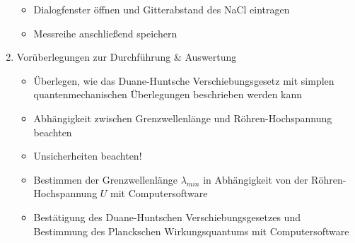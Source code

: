 \documentclass{article}
\begin{document}
\begin{enumerate}[label = (\Roman*)]
\begin{itemize}
            \item Dialogfenster öffnen und Gitterabstand des NaCl eintragen
            \item Messreihe anschließend speichern
        \end{itemize}

    \item Vorüberlegungen zur Durchführung \& Auswertung
        \begin{itemize}
            \item Überlegen, wie das Duane-Huntsche Verschiebungsgesetz mit simplen quantenmechanischen Überlegungen beschrieben werden kann
            \item Abhängigkeit zwischen Grenzwellenlänge und Röhren-Hochspannung beachten
            \item Unsicherheiten beachten!
            \item Bestimmen der Grenzwellenlänge $\lambda_{min}$ in Abhängigkeit von der Röhren-Hochspannung $U$ mit Computersoftware
            \item Bestätigung des Duane-Huntschen Verschiebungsgesetzes und Bestimmung des Planckschen Wirkungsquantums mit Computersoftware
        \end{itemize}
    
\end{enumerate}


\newpage
\end{document}
